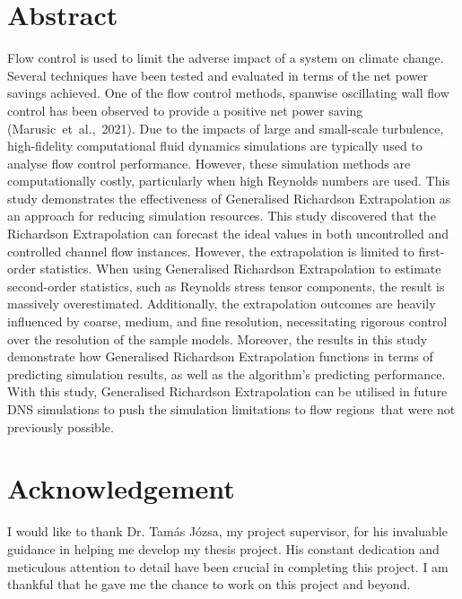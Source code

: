 \documentclass[12pt]{article}
\begin{document}
\section*{Abstract}
Flow control is used to limit the adverse impact of a system on climate change. Several techniques have been tested and evaluated in terms of the net power savings achieved. One of the flow control methods, spanwise oscillating wall flow control has been observed to provide a positive net power saving (Marusic et al., 2021). Due to the impacts of large and small-scale turbulence, high-fidelity computational fluid dynamics simulations are typically used to analyse flow control performance. However, these simulation methods are computationally costly, particularly when high Reynolds numbers are used. This study demonstrates the effectiveness of Generalised Richardson Extrapolation as an approach for reducing simulation resources. This study discovered that the Richardson Extrapolation can forecast the ideal values in both uncontrolled and controlled channel flow instances.  However, the extrapolation is limited to first-order statistics. When using Generalised Richardson Extrapolation to estimate second-order statistics, such as Reynolds stress tensor components, the result is massively overestimated. Additionally, the extrapolation outcomes are heavily influenced by coarse, medium, and fine resolution, necessitating rigorous control over the resolution of the sample models. Moreover, the results in this study demonstrate how Generalised Richardson Extrapolation functions in terms of predicting simulation results, as well as the algorithm's predicting performance. With this study, Generalised Richardson Extrapolation can be utilised in future DNS simulations to push the simulation limitations to flow regions that were not previously possible.




\clearpage
\pagestyle{plain}
\pagestyle{fancy}
\fancyhead[L]{}
\clearpage



\section*{Acknowledgement}
I would like to thank Dr. Tamás Józsa, my project supervisor, for his invaluable guidance in helping me develop my thesis project. His constant dedication and meticulous attention to detail have been crucial in completing this project. I am thankful that he gave me the chance to work on this project and beyond. 
\end{document}
